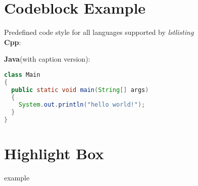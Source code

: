 \documentclass{assignment}
\begin{document}

\section*{Codeblock Example}

Predefined code style for all languages supported by \textit{lstlisting}\\
\textbf{Cpp}:

\textbf{Java}(with caption version):
\begin{lstlisting}[language=Java, caption={showcase.java}]
class Main
{
  public static void main(String[] args)
  {
    System.out.println("hello world!");
  }
}
\end{lstlisting}

\section*{Highlight Box}

 example
\end{document}
